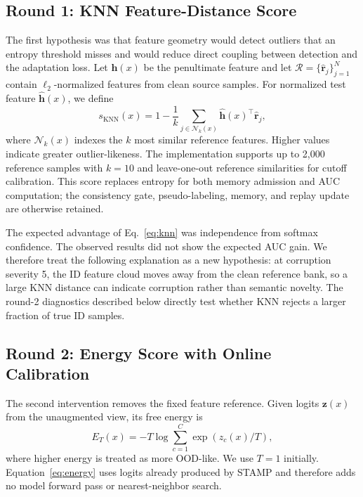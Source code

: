 \subsection{Round 1: KNN Feature-Distance Score}
The first hypothesis was that feature geometry would detect outliers that an
entropy threshold misses and would reduce direct coupling between detection and
the adaptation loss. Let $\mathbf{h}(x)$ be the penultimate feature and let
$\mathcal{R}=\{\hat{\mathbf{r}}_j\}_{j=1}^{N}$ contain $\ell_2$-normalized
features from clean source samples. For normalized test feature
$\hat{\mathbf{h}}(x)$, we define
\begin{equation}
    s_{\mathrm{KNN}}(x)=1-\frac{1}{k}
    \sum_{j\in\mathcal{N}_k(x)}
    \hat{\mathbf{h}}(x)^{\top}\hat{\mathbf{r}}_j,
    \label{eq:knn}
\end{equation}
where $\mathcal{N}_k(x)$ indexes the $k$ most similar reference features.
Higher values indicate greater outlier-likeness. The implementation supports
up to 2,000 reference samples with $k=10$ and leave-one-out reference
similarities for cutoff calibration. This score replaces entropy for both
memory admission and AUC computation; the consistency gate, pseudo-labeling,
memory, and replay update are otherwise retained.

The expected advantage of Eq.~\eqref{eq:knn} was independence from softmax
confidence. The observed results did not show the expected AUC gain. We
therefore treat the following explanation as a new hypothesis: at corruption
severity 5, the ID feature cloud moves away from the clean reference bank, so a
large KNN distance can indicate corruption rather than semantic novelty. The
round-2 diagnostics described below directly test whether KNN rejects a larger
fraction of true ID samples.

\subsection{Round 2: Energy Score with Online Calibration}
The second intervention removes the fixed feature reference. Given logits
$\mathbf{z}(x)$ from the unaugmented view, its free energy is
\begin{equation}
    E_T(x)=-T\log\sum_{c=1}^{C}\exp\left(z_c(x)/T\right),
    \label{eq:energy}
\end{equation}
where higher energy is treated as more OOD-like. We use $T=1$ initially.
Equation~\eqref{eq:energy} uses logits already produced by STAMP and therefore
adds no model forward pass or nearest-neighbor search.

